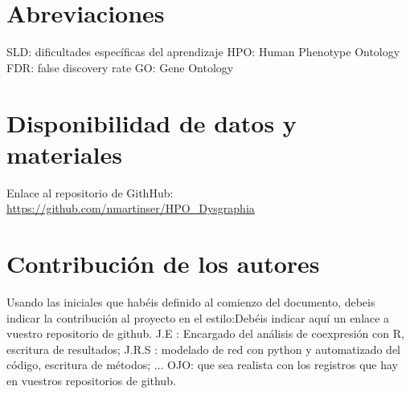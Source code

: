 \documentclass{bmcart}
\begin{document}
	\begin{backmatter}
	
		\section*{Abreviaciones}%
			SLD: dificultades específicas del aprendizaje
			HPO: Human Phenotype Ontology
			FDR: false discovery rate
			GO: Gene Ontology
		
		\section*{Disponibilidad de datos y materiales}%
			Enlace al repositorio de GithHub: \url{https://github.com/nmartinser/HPO_Dysgraphia}
		
		\section*{Contribución de los autores}
			Usando las iniciales que habéis definido al comienzo del documento, debeis indicar la contribución al proyecto en el estilo:Debéis indicar aquí un enlace a vuestro repositorio de github.
			J.E : Encargado del análisis de coexpresión con R, escritura de resultados; J.R.S : modelado de red con python y automatizado del código, escritura de métodos; ...
			OJO: que sea realista con los registros que hay en vuestros repositorios de github. 
		
		
		
	
	\end{backmatter}
\end{document}
